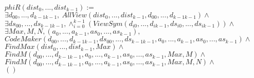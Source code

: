 \documentclass{article}
\begin{document}
\begin{center}
$phiR(dist_{0}, ...,dist_{k-1}):=$\\
$\exists d_{00}, ...,d_{k-1k-1},\ AllView(dist_{0}, ...,dist_{k-1}, d_{00}, ...,d_{k-1k-1})\land$\\
$\exists ds_{00}, ...,ds_{k-1k-1}, \land_{i=0}^{k-1} (ViewSym(d_{i0}, ..., d_{ik-1}, ds_{i0}, ..., ds_{ik-1}))\land$\\
$\exists Max, M, N, (a_{0}, ..., a_{k-1}, as_{0}, ..., as_{k-1}),$\\
$CodeMaker(d_{00}, ...,d_{k-1k-1}, ds_{00}, ...,ds_{k-1k-1}, a_{0}, ..., a_{k-1}, as_{0}, ..., as_{k-1})\land$\\
$FindMax(dist_{0}, ...,dist_{k-1}, Max) \land$\\
$FindM(d_{00}, ...,d_{k-1k-1}, a_{0}, ..., a_{k-1}, as_{0}, ..., as_{k-1}, Max, M) \land $\\
$FindM(d_{00}, ...,d_{k-1k-1}, a_{0}, ..., a_{k-1}, as_{0}, ..., as_{k-1}, Max, M, N) \land $\\
$()$%

\end{center}
\end{document}
